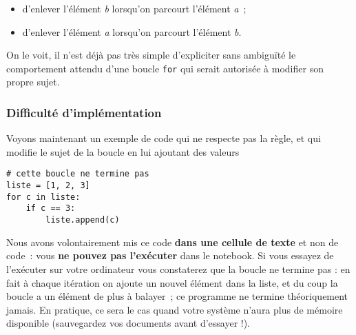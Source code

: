 \begin{itemize}
\tightlist
\item
  d'enlever l'élément \emph{b} lorsqu'on parcourt l'élément \emph{a}~;
\item
  d'enlever l'élément \emph{a} lorsqu'on parcourt l'élément \emph{b}.
\end{itemize}

On le voit, il n'est déjà pas très simple d'expliciter sans ambiguïté le
comportement attendu d'une boucle \texttt{for} qui serait autorisée à
modifier son propre sujet.

    \hypertarget{difficultuxe9-dimpluxe9mentation}{%
\subsubsection{Difficulté
d'implémentation}\label{difficultuxe9-dimpluxe9mentation}}

    Voyons maintenant un exemple de code qui ne respecte pas la règle, et
qui modifie le sujet de la boucle en lui ajoutant des valeurs

    \begin{verbatim}
# cette boucle ne termine pas
liste = [1, 2, 3]
for c in liste:
    if c == 3:
        liste.append(c)
\end{verbatim}

    Nous avons volontairement mis ce code \textbf{dans une cellule de texte}
et non de code~: vous \textbf{ne pouvez pas l'exécuter} dans le
notebook. Si vous essayez de l'exécuter sur votre ordinateur vous
constaterez que la boucle ne termine pas : en fait à chaque itération on
ajoute un nouvel élément dans la liste, et du coup la boucle a un
élément de plus à balayer~; ce programme ne termine théoriquement
jamais. En pratique, ce sera le cas quand votre système n'aura plus de
mémoire disponible (sauvegardez vos documents avant d'essayer !).


    
    
    

